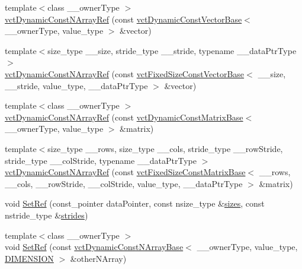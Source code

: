 \begin{DoxyCompactItemize}
\item 
{\footnotesize template$<$class \+\_\+\+\_\+owner\+Type $>$ }\\\hyperlink{classvct_dynamic_const_n_array_ref_a027bb3c565f2e28905b5758ebd806bfd}{vct\+Dynamic\+Const\+N\+Array\+Ref} (const \hyperlink{classvct_dynamic_const_vector_base}{vct\+Dynamic\+Const\+Vector\+Base}$<$ \+\_\+\+\_\+owner\+Type, value\+\_\+type $>$ \&vector)
\item 
{\footnotesize template$<$size\+\_\+type \+\_\+\+\_\+size, stride\+\_\+type \+\_\+\+\_\+stride, typename \+\_\+\+\_\+data\+Ptr\+Type $>$ }\\\hyperlink{classvct_dynamic_const_n_array_ref_a0c766c28385dbe64ee4bcd292d35a2ac}{vct\+Dynamic\+Const\+N\+Array\+Ref} (const \hyperlink{classvct_fixed_size_const_vector_base}{vct\+Fixed\+Size\+Const\+Vector\+Base}$<$ \+\_\+\+\_\+size, \+\_\+\+\_\+stride, value\+\_\+type, \+\_\+\+\_\+data\+Ptr\+Type $>$ \&vector)
\item 
{\footnotesize template$<$class \+\_\+\+\_\+owner\+Type $>$ }\\\hyperlink{classvct_dynamic_const_n_array_ref_a5b0a8d09e3f3b9fc3504bb24a91c9903}{vct\+Dynamic\+Const\+N\+Array\+Ref} (const \hyperlink{classvct_dynamic_const_matrix_base}{vct\+Dynamic\+Const\+Matrix\+Base}$<$ \+\_\+\+\_\+owner\+Type, value\+\_\+type $>$ \&matrix)
\item 
{\footnotesize template$<$size\+\_\+type \+\_\+\+\_\+rows, size\+\_\+type \+\_\+\+\_\+cols, stride\+\_\+type \+\_\+\+\_\+row\+Stride, stride\+\_\+type \+\_\+\+\_\+col\+Stride, typename \+\_\+\+\_\+data\+Ptr\+Type $>$ }\\\hyperlink{classvct_dynamic_const_n_array_ref_a1f6ad56c805dcbabf339a832a4ce03ad}{vct\+Dynamic\+Const\+N\+Array\+Ref} (const \hyperlink{classvct_fixed_size_const_matrix_base}{vct\+Fixed\+Size\+Const\+Matrix\+Base}$<$ \+\_\+\+\_\+rows, \+\_\+\+\_\+cols, \+\_\+\+\_\+row\+Stride, \+\_\+\+\_\+col\+Stride, value\+\_\+type, \+\_\+\+\_\+data\+Ptr\+Type $>$ \&matrix)
\item 
void \hyperlink{classvct_dynamic_const_n_array_ref_a884884393e32fd34236be9c1a60c5ad2}{Set\+Ref} (const\+\_\+pointer data\+Pointer, const nsize\+\_\+type \&\hyperlink{classvct_dynamic_const_n_array_base_aa86793343d80325ba5671bc24a2e0e8f}{sizes}, const nstride\+\_\+type \&\hyperlink{classvct_dynamic_const_n_array_base_a6608baee60a448ccb9598417c487cde2}{strides})
\item 
{\footnotesize template$<$class \+\_\+\+\_\+owner\+Type $>$ }\\void \hyperlink{classvct_dynamic_const_n_array_ref_a65a8a12c6c64b63ead1653c9cf8b2e16}{Set\+Ref} (const \hyperlink{classvct_dynamic_const_n_array_base}{vct\+Dynamic\+Const\+N\+Array\+Base}$<$ \+\_\+\+\_\+owner\+Type, value\+\_\+type, \hyperlink{group__cisst_vector_ggae8d52484153d181fd3ac08be58589848ae003ed9f88ed51f50c6c180506995b93}{D\+I\+M\+E\+N\+S\+I\+O\+N} $>$ \&other\+N\+Array)

\end{DoxyCompactItemize}
